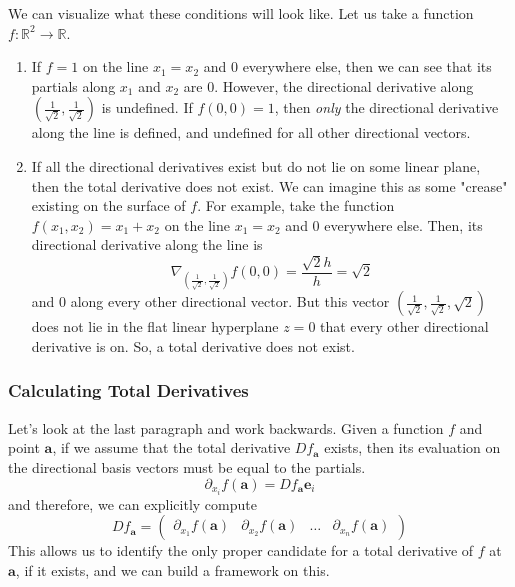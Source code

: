 \documentclass{article}
\theoremstyle{remark}
\theoremstyle{definition}
\begin{document}
We can visualize what these conditions will look like. Let us take a function $f: \mathbb{R}^2 \longrightarrow \mathbb{R}$. 
\begin{enumerate}
    \item If $f = 1$ on the line $x_1 = x_2$ and $0$ everywhere else, then we can see that its partials along $x_1$ and $x_2$ are $0$. However, the directional derivative along $(\frac{1}{\sqrt{2}}, \frac{1}{\sqrt{2}})$ is undefined. If $f(0, 0) = 1$, then \textit{only} the directional derivative along the line is defined, and undefined for all other directional vectors. 
    \item If all the directional derivatives exist but do not lie on some linear plane, then the total derivative does not exist. We can imagine this as some "crease" existing on the surface of $f$. For example, take the function $f(x_1, x_2) = x_1 + x_2$ on the line $x_1 = x_2$ and $0$ everywhere else. Then, its directional derivative along the line is 
    \[\nabla_{(\frac{1}{\sqrt{2}}, \frac{1}{\sqrt{2}})} f (0, 0) = \frac{\sqrt{2} h}{h} = \sqrt{2}\]
    and $0$ along every other directional vector. But this vector $(\frac{1}{\sqrt{2}}, \frac{1}{\sqrt{2}}, \sqrt{2})$ does not lie in the flat linear hyperplane $z = 0$ that every other directional derivative is on. So, a total derivative does not exist. 
\end{enumerate}

\subsubsection{Calculating Total Derivatives}

Let's look at the last paragraph and work backwards. Given a function $f$ and point $\mathbf{a}$, if we assume that the total derivative $D f_\mathbf{a}$ exists, then its evaluation on the directional basis vectors must be equal to the partials. 
\[\partial_{x_i} f(\mathbf{a}) = D f_\mathbf{a} \mathbf{e}_i\]
and therefore, we can explicitly compute 
\[D f_\mathbf{a} = \begin{pmatrix} \partial_{x_1} f(\mathbf{a}) & \partial_{x_2} f(\mathbf{a}) & \ldots & \partial_{x_n} f(\mathbf{a}) \end{pmatrix}\]
This allows us to identify the only proper candidate for a total derivative of $f$ at $\mathbf{a}$, if it exists, and we can build a framework on this. 
\end{document}
